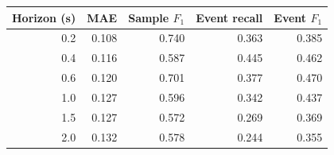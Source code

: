 \begin{tabular}{rrrrr}
\toprule
Horizon (s) & MAE & Sample $F_1$ & Event recall & Event $F_1$ \\
\midrule
0.2 & 0.108 & 0.740 & 0.363 & 0.385 \\
0.4 & 0.116 & 0.587 & 0.445 & 0.462 \\
0.6 & 0.120 & 0.701 & 0.377 & 0.470 \\
1.0 & 0.127 & 0.596 & 0.342 & 0.437 \\
1.5 & 0.127 & 0.572 & 0.269 & 0.369 \\
2.0 & 0.132 & 0.578 & 0.244 & 0.355 \\
\bottomrule
\end{tabular}

